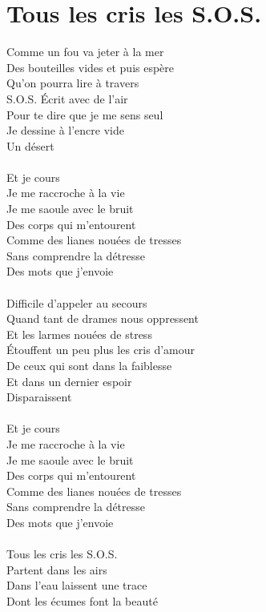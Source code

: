 \section*{Tous les cris les S.O.S.}
Comme un fou va jeter à la mer\\
Des bouteilles vides et puis espère\\
Qu'on pourra lire à travers\\
S.O.S. Écrit avec de l'air\\
Pour te dire que je me sens seul\\
Je dessine à l'encre vide\\
Un désert\\\\
Et je cours\\
Je me raccroche à la vie\\
Je me saoule avec le bruit\\
Des corps qui m'entourent\\
Comme des lianes nouées de tresses\\
Sans comprendre la détresse\\
Des mots que j'envoie\\\\
Difficile d'appeler au secours\\
Quand tant de drames nous oppressent\\
Et les larmes nouées de stress\\
Étouffent un peu plus les cris d'amour\\
De ceux qui sont dans la faiblesse\\
Et dans un dernier espoir\\
Disparaissent\\\\
Et je cours\\
Je me raccroche à la vie\\
Je me saoule avec le bruit\\
Des corps qui m'entourent\\
Comme des lianes nouées de tresses\\
Sans comprendre la détresse\\
Des mots que j'envoie\\\\
Tous les cris les S.O.S.\\
Partent dans les airs\\
Dans l'eau laissent une trace\\
Dont les écumes font la beauté\\
